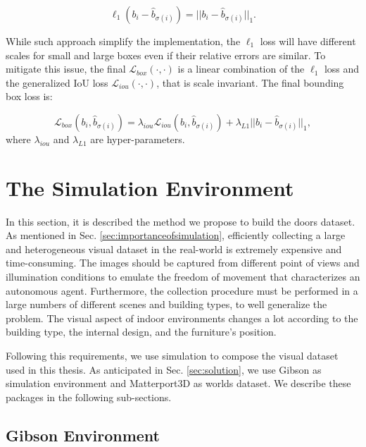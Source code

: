 \begin{equation}
\ell_1(b_i - \hat b_{\sigma(i)}) = ||b_i - \hat b_{\sigma(i)}||_1.
\end{equation}

While such approach simplify the implementation, the $\ell_1$ loss will have different scales for small and large boxes even if their relative errors are similar. To mitigate this issue, the final $\mathcal{L}_{box}(\cdot, \cdot)$ is a linear combination of the $\ell_1$ loss and the generalized IoU loss \cite{generalizediou} $\mathcal{L}_{iou}(\cdot, \cdot)$, that is scale invariant. The final bounding box loss is:

\begin{equation}
\mathcal{L}_{box}(b_i, \hat b_{\sigma(i)}) = \lambda_{iou}\mathcal{L}_{iou}(b_i, \hat b_{\sigma(i)}) + \lambda_{L1}||b_i - \hat b_{\sigma(i)}||_1,
\end{equation}
where $\lambda_{iou}$ and $\lambda_{L1}$ are hyper-parameters.

\section{The Simulation Environment}

In this section, it is described the method we propose to build the doors dataset. As mentioned in Sec. \ref{sec:importanceofsimulation}, efficiently collecting a large and heterogeneous visual dataset in the real-world is extremely expensive and time-consuming. The images should be captured from different point of views and illumination conditions to emulate the freedom of movement that characterizes an autonomous agent. Furthermore, the collection procedure must be performed in a large numbers of different scenes and building types, to well generalize the problem. The visual aspect of indoor environments changes a lot according to the building type, the internal design, and the furniture's position.

Following this requirements, we use simulation to compose the visual dataset used in this thesis. As anticipated in Sec. \ref{sec:solution}, we use Gibson \cite{gibson} as simulation environment and Matterport3D \cite{matterport} as worlds dataset. We describe these packages in the following sub-sections.

\subsection{Gibson Environment}

